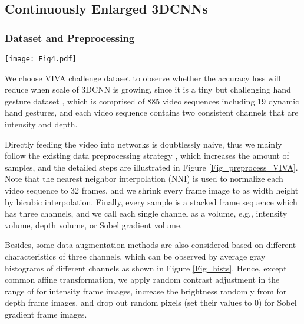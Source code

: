 \documentclass[a4paper,fleqn]{cas-dc}
\begin{document}
\subsection{Continuously Enlarged 3DCNNs}

\subsubsection{Dataset and Preprocessing}\quad

\begin{figure*}
\centering
\texttt{[image: Fig4.pdf]}
\caption{\textbf{Data preprocessing for VIVA challenge dataset.} Note that not all samples can be processed in Step c because a minority of dynamic gestures do not have characteristic of time symmetry. All the frame images shown here are from the video with the serial number ``02\_01\_03'' in original dataset.}
\label{Fig_preprocess_VIVA}
\end{figure*}

We choose VIVA challenge dataset to observe whether the accuracy loss will reduce when scale of 3DCNN is growing, since it is a tiny but challenging hand gesture dataset \citep{Ohn-Bar_2014_VIVA,Molchanov_2015_3DCNN_1}, which is comprised of 885 video sequences including 19 dynamic hand gestures, and each video sequence contains two consistent channels that are intensity and depth.

Directly feeding the video into networks is doubtlessly naive, thus we mainly follow the existing data preprocessing strategy \citep{Molchanov_2015_3DCNN_1}, which increases the amount of samples, and the detailed steps are illustrated in Figure \ref{Fig_preprocess_VIVA}. Note that the nearest neighbor interpolation (NNI) \citep{Molchanov_2015_3DCNN_1} is used to normalize each video sequence to 32 frames, and we shrink every frame image to  as width  height by bicubic interpolation. Finally, every sample is a stacked frame sequence which has three channels, and we call each single channel as a volume, e.g., intensity volume, depth volume, or Sobel gradient volume.

Besides, some data augmentation methods are also considered based on different characteristics of three channels, which can be observed by average gray histograms of different channels as shown in Figure \ref{Fig_hists}. Hence, except common affine transformation, we apply random contrast adjustment in the range of  for intensity frame images, increase the brightness randomly from  for depth frame images, and drop out random  pixels (set their values to 0) for Sobel gradient frame images.
\end{document}
